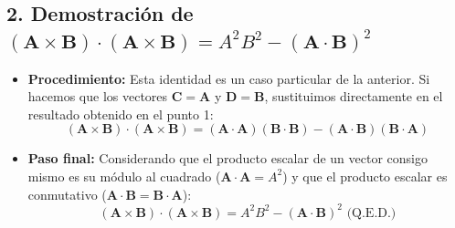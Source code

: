 \documentclass[a4paper]{article}
\begin{document}
\subsection*{2. Demostración de $(\mathbf{A} \times \mathbf{B}) \cdot (\mathbf{A} \times \mathbf{B}) = A^2 B^2 - (\mathbf{A} \cdot \mathbf{B})^2$}

\begin{itemize}
    \item \textbf{Procedimiento:}
    Esta identidad es un caso particular de la anterior. Si hacemos que los vectores $\mathbf{C} = \mathbf{A}$ y $\mathbf{D} = \mathbf{B}$, sustituimos directamente en el resultado obtenido en el punto 1:
    \begin{equation}
        (\mathbf{A} \times \mathbf{B}) \cdot (\mathbf{A} \times \mathbf{B}) = (\mathbf{A} \cdot \mathbf{A})(\mathbf{B} \cdot \mathbf{B}) - (\mathbf{A} \cdot \mathbf{B})(\mathbf{B} \cdot \mathbf{A})
    \end{equation}

    \item \textbf{Paso final:}
    Considerando que el producto escalar de un vector consigo mismo es su módulo al cuadrado ($\mathbf{A} \cdot \mathbf{A} = A^2$) y que el producto escalar es conmutativo ($\mathbf{A} \cdot \mathbf{B} = \mathbf{B} \cdot \mathbf{A}$):
    \begin{equation}
        (\mathbf{A} \times \mathbf{B}) \cdot (\mathbf{A} \times \mathbf{B}) = A^2 B^2 - (\mathbf{A} \cdot \mathbf{B})^2 \text{ (Q.E.D.)}
    \end{equation}
\end{itemize}




 
\end{document}
